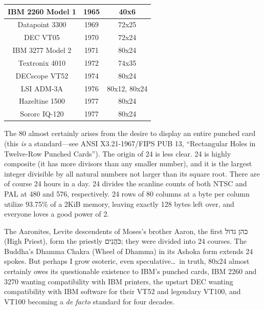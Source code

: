 \documentclass[letterpaper,10pt]{article}
\begin{document}
\begin{center}
  \begin{tabular}{ |c|c|c| }
    \hline
    IBM 2260 Model 1 & 1965 & 40x6 \\
    \hline
    Datapoint 3300 & 1969 & 72x25 \\
    \hline
    DEC VT05 & 1970 & 72x24 \\
    \hline
    IBM 3277 Model 2 & 1971 & 80x24 \\
    \hline
    Textronix 4010 & 1972 & 74x35 \\
    \hline
    DECscope VT52 & 1974 & 80x24 \\
    \hline
    LSI ADM-3A & 1976 & 80x12, 80x24 \\
    \hline
    Hazeltine 1500 & 1977 & 80x24 \\
    \hline
    Sororc IQ-120 & 1977 & 80x24 \\
    \hline
  \end{tabular}
\end{center}

\vspace{.25in}

The 80 almost certainly arises from the desire to display an entire punched card
(this \textit{is} a standard---see ANSI X3.21-1967/FIPS PUB 13, ``Rectangular
Holes in Twelve-Row Punched Cards'')\cite{sonicdelay}. The origin of 24 is less
clear. 24 is highly composite (it has more divisors than any smaller number),
and it is the largest integer divisible by all natural numbers not larger than its
square root. There are of course 24 hours in a day. 24 divides the scanline
counts of both NTSC and PAL at 480 and 576, respectively. 24 rows of
80 columns at a byte per column utilize 93.75\% of a 2KiB memory, leaving exactly
128 bytes left over, and everyone loves a good power of 2.

The Aaronites, Levite descendents of Moses's brother Aaron, the first
\texthebrew{כהן גדול}
(High Priest),
form the priestly \texthebrew{כֹּהֲנִים}; they were divided into 24 courses. The Buddha's Dhamma Chakra (Wheel of Dhamma)
in its Ashoka form extends 24 spokes. But perhaps I grow esoteric, even
speculative\ldots\ in truth, 80x24 almost certainly owes its questionable
existence to IBM's punched cards, IBM 2260 and 3270 wanting compatibility with
IBM printers, the upstart DEC wanting compatibility with IBM software for their
VT52 and legendary VT100, and VT100 becoming a \textit{de facto} standard for
four decades.
\end{document}
